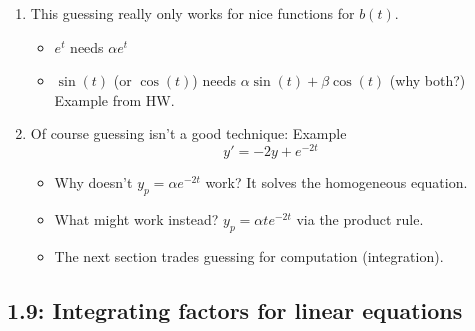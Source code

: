 \documentclass{article}
\begin{document}
\begin{enumerate}
\begin{enumerate}
\item This guessing really only works for nice functions for $b(t)$.
\begin{itemize}
\item $e^t$ needs $\alpha e^t$
\item $\sin(t)$ (or $\cos(t)$) needs $\alpha \sin(t)+\beta\cos(t)$ (why both?) Example from HW.
\end{itemize}
\item Of course guessing isn't a good technique: Example
\[
y' = -2y + e^{-2t}
\]
\begin{itemize}
\item Why doesn't $y_p = \alpha e^{-2t}$ work? It solves the homogeneous equation.
\item What might work instead? $y_p = \alpha te^{-2t}$ via the product rule.
\item The next section trades guessing for computation (integration). 
\end{itemize}
\end{enumerate}

\end{enumerate}


\subsection{1.9: Integrating factors for linear equations}
\end{document}
